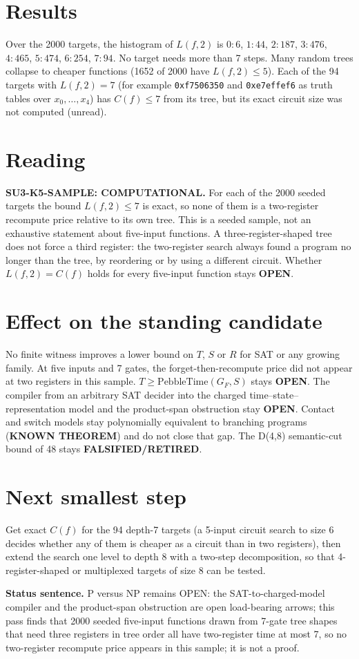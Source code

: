 \documentclass[11pt]{article}
\begin{document}
\section*{Results}
Over the 2000 targets, the histogram of $L(f,2)$ is $0{:}6$, $1{:}44$, $2{:}187$, $3{:}476$, $4{:}465$, $5{:}474$, $6{:}254$, $7{:}94$. No target needs more than 7 steps. Many random trees collapse to cheaper functions (1652 of 2000 have $L(f,2)\le5$). Each of the 94 targets with $L(f,2)=7$ (for example \texttt{0xf7506350} and \texttt{0xe7effef6} as truth tables over $x_0,\dots,x_4$) has $C(f)\le7$ from its tree, but its exact circuit size was not computed (unread).

\section*{Reading}
\textbf{SU3-K5-SAMPLE: COMPUTATIONAL.} For each of the 2000 seeded targets the bound $L(f,2)\le7$ is exact, so none of them is a two-register recompute price relative to its own tree. This is a seeded sample, not an exhaustive statement about five-input functions. A three-register-shaped tree does not force a third register: the two-register search always found a program no longer than the tree, by reordering or by using a different circuit. Whether $L(f,2)=C(f)$ holds for every five-input function stays \textbf{OPEN}.

\section*{Effect on the standing candidate}
No finite witness improves a lower bound on $T$, $S$ or $R$ for SAT or any growing family. At five inputs and 7 gates, the forget-then-recompute price did not appear at two registers in this sample. $T\ge\mathrm{PebbleTime}(G_F,S)$ stays \textbf{OPEN}. The compiler from an arbitrary SAT decider into the charged time--state--representation model and the product-span obstruction stay \textbf{OPEN}. Contact and switch models stay polynomially equivalent to branching programs (\textbf{KNOWN THEOREM}) and do not close that gap. The D(4,8) semantic-cut bound of 48 stays \textbf{FALSIFIED/RETIRED}.

\section*{Next smallest step}
Get exact $C(f)$ for the 94 depth-7 targets (a 5-input circuit search to size 6 decides whether any of them is cheaper as a circuit than in two registers), then extend the search one level to depth 8 with a two-step decomposition, so that 4-register-shaped or multiplexed targets of size 8 can be tested.

\bigskip
\noindent\textbf{Status sentence.} P versus NP remains OPEN: the SAT-to-charged-model compiler and the product-span obstruction are open load-bearing arrows; this pass finds that 2000 seeded five-input functions drawn from 7-gate tree shapes that need three registers in tree order all have two-register time at most 7, so no two-register recompute price appears in this sample; it is not a proof.
\end{document}
